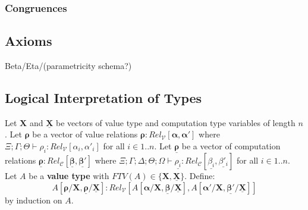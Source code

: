 \documentclass{article}
\begin{document}
\begin{prooftree}
\end{prooftree}

\subsubsection{Congruences}
\begin{prooftree}
\end{prooftree}
\subsection{Axioms}
Beta/Eta/(parametricity schema?)


\subsection{Logical Interpretation of Types}
Let $\bm{X}$ and $\bm{\underline{X}}$ be vectors of value type and computation type variables of length $n$.
Let $\bm{\rho}$ be a vector of value relations $\bm{\rho} : Rel_{\mathcal{V}}[\bm{\alpha}, \bm{\alpha'}]$ 
where $\Xi ; \Gamma ; \Theta \vdash \rho_i : Rel_{\mathcal{V}}[\alpha_i , \alpha'_i]$ for all $i \in {1..n}$.
Let $\bm{\underline{\rho}}$ be a vector of computation relations $\bm{\underline{\rho}} : Rel_{\mathcal{C}}[\bm{\underline{\beta}}, \bm{\underline{\beta'}}]$ 
where $\Xi ; \Gamma ; \Delta ; \Theta ; \Omega \vdash \underline{\rho_i} : Rel_{\mathcal{C}}[\underline{\beta_i} , \underline{\beta'_i}]$ for all $i \in {1..n}$.
\\Let $A$ be a \textbf{value type} with $FTV(A) \in \{\bm{X},\bm{\underline{X}}\}$. Define:
\[
  A[\bm{\rho}/\bm{X},\bm{\underline{\rho}}/\bm{\underline{X}}] : Rel_{\mathcal{V}}[A[\bm{\alpha}/\bm{X},\bm{\underline{\beta}}/\bm{\underline{X}}], A[\bm{\alpha'}/\bm{X},\bm{\underline{\beta'}/\bm{\underline{X}}}]] 
\] 
by induction on $A$. 
\end{document}
